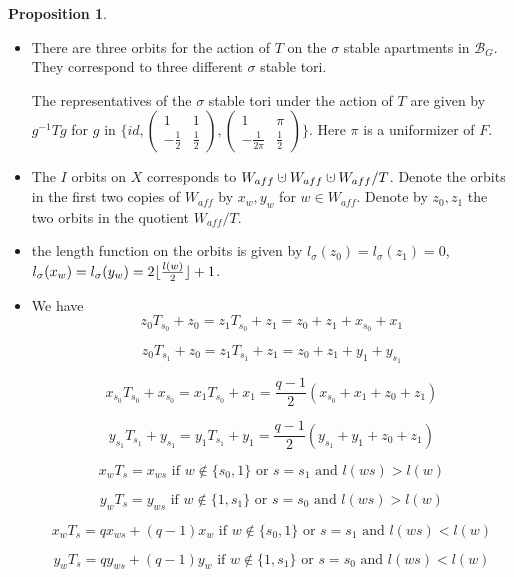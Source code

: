 \documentclass[12pt]{article}
\newcommand{\B}{\mathcal{B}}
\newcommand{\<}{\langle}
\renewcommand{\>}{\rangle}
\theoremstyle{plain}
\theoremstyle{definition}
\newtheorem{prop}[theorem]{Proposition}
\DeclarePairedDelimiter\floor{\lfloor}{\rfloor}
\begin{document}
\begin{prop}\label{8.2}
\begin{itemize}
    \item There are three orbits for the action of $T$ on the $\sigma$ stable apartments in $\B_G$. They correspond to three different $\sigma$ stable tori. 
    
    The representatives of the $\sigma$ stable tori under the action of $T$ are given by $g^{-1}Tg$ for $g$ in $\{id,\begin{pmatrix}
        1 & 1  \\
        -\frac{1}{2} & \frac{1}{2}
        \end{pmatrix},\begin{pmatrix}
        1 & \pi  \\
        -\frac{1}{2\pi} & \frac{1}{2}
        \end{pmatrix}\}$. Here $\pi$ is a uniformizer of $F$.
    \item The $I$ orbits on $X$ corresponds to $W_{aff}\mathbin{\mathaccent\cdot\cup} W_{aff}\mathbin{\mathaccent\cdot\cup} W_{aff}/T$. Denote the orbits in the first two copies of $W_{aff}$ by $x_w,y_w$ for $w\in W_{aff}$. Denote by $z_0,z_1$ the two orbits in the quotient $W_{aff}/T$.
    
    \item the length function on the orbits is given by $l_\sigma(z_0)=l_\sigma(z_1)=0$, $l_\sigma(x_w)=l_\sigma(y_w)=2\floor{\frac{l(w)}{2}}+1$.
    
    \item We have $$z_0T_{s_0}+z_0=z_1T_{s_0}+z_1=z_0+z_1+x_{s_0}+x_1$$
    
    $$z_0T_{s_1}+z_0=z_1T_{s_1}+z_1=z_0+z_1+y_{1}+y_{s_1}$$
    
    $$x_{s_0}T_{s_0}+x_{s_0}=x_{1}T_{s_0}+x_{1}=\frac{q-1}{2}(x_{s_0}+x_{1}+z_0+z_1)$$
    
    $$y_{s_1}T_{s_1}+y_{s_1}=y_{1}T_{s_1}+y_{1}=\frac{q-1}{2}(y_{s_1}+y_{1}+z_0+z_1)$$
    
    $$x_wT_s=x_{ws}\text{ if } w\notin \{s_0,1\}\text{ or }s=s_1\text{ and }l(ws)>l(w)$$
    
    $$y_wT_s=y_{ws}\text{ if } w\notin \{1,s_1\}\text{ or }s=s_0\text{ and }l(ws)>l(w)$$
    
    $$x_wT_s=qx_{ws}+(q-1)x_w\text{ if } w\notin \{s_0,1\}\text{ or }s=s_1\text{ and }l(ws)<l(w)$$
    
    $$y_wT_s=qy_{ws}+(q-1)y_w\text{ if } w\notin \{1,s_1\}\text{ or }s=s_0\text{ and }l(ws)<l(w)$$
    

\end{itemize}
\end{prop}
\end{document}
